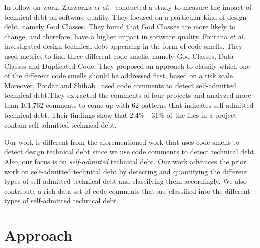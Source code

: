 In follow on work, Zazworka \textit{et al.}~\cite{Zazworka2011MTD} conducted a study to measure the impact of technical debt on software quality. They focused on a particular kind of design debt, namely God Classes. They found that God Classes are more likely to change, and therefore, have a higher impact in software quality. Fontana \textit{et al.}~\cite{Fontana2012MTD} investigated design technical debt appearing in the form of code smells. They used metrics to find three different code smells, namely God Classes, Data Classes and Duplicated Code. They proposed an approach to classify which one of the different code smells should be addressed first, based on a risk scale. Moreover, Potdar and Shihab~\cite{Potdar2014ICSME} used code comments to detect self-admitted technical debt.They extracted the comments of four projects and analyzed more than 101,762 comments to come up with 62 patterns that indicates self-admitted technical debt. Their findings show that 2.4\% - 31\% of the files in a project contain self-admitted technical debt.

Our work is different from the aforementioned work that uses code smells to detect design technical debt since we use code comments to detect technical debt. Also, our focus is on \emph{self-admitted} technical debt. Our work advances the prior work on self-admitted technical debt by detecting and quantifying the different types of self-admitted technical debt and classifying them accordingly. We also contribute a rich data set of code comments that are classified into the different types of self-admitted technical debt.

\section{Approach}
\label{chap3:sec:approach}

